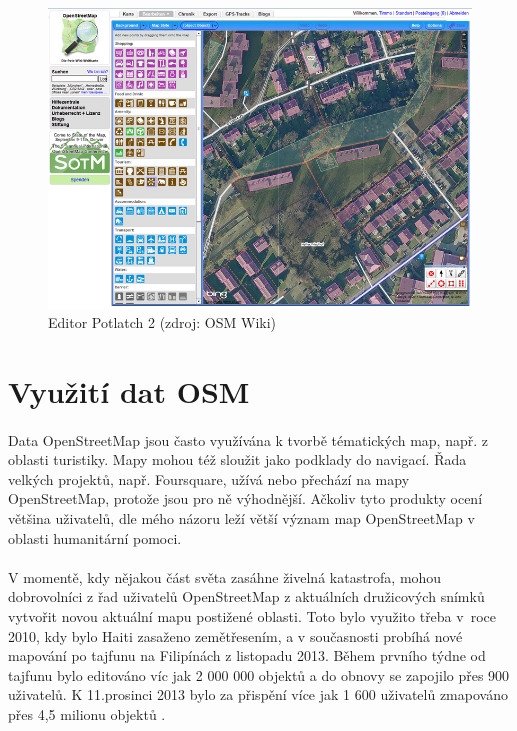 \documentclass[11pt,a4paper,titlepage,oneside]{book}
\begin{document}
		\begin{figure}[!h]
			\begin{center}
				\includegraphics[width=12cm]{obrazky/p2_osm.png}
				\caption{Editor Potlatch 2 (zdroj: OSM Wiki\cite{wiki_p2})}
			\end{center}
		\end{figure}

	\section{Využití dat OSM}
		\paragraph{} Data OpenStreetMap jsou často využívána k tvorbě tématických map, např. z oblasti turistiky. Mapy mohou též sloužit jako podklady do navigací. Řada velkých projektů, např. Foursquare, užívá nebo přechází na mapy OpenStreetMap, protože jsou pro ně výhodnější. Ačkoliv tyto produkty ocení většina uživatelů, dle mého názoru leží větší význam map OpenStreetMap v oblasti humanitární pomoci.
		\paragraph{}V momentě, kdy nějakou část světa zasáhne živelná katastrofa, mohou dobrovolníci z řad uživatelů OpenStreetMap z aktuálních družicových snímků vytvořit novou aktuální mapu postižené oblasti. Toto bylo využito třeba v~roce 2010, kdy bylo Haiti zasaženo zemětřesením, a v současnosti probíhá nové mapování po tajfunu na Filipínách z listopadu 2013. Během prvního týdne od tajfunu bylo editováno víc jak 2 000 000 objektů a do obnovy se zapojilo přes 900 uživatelů. K 11.prosinci 2013 bylo za přispění více jak 1 600 uživatelů zmapováno přes 4,5 milionu objektů \cite{wiki_tajfun}.
\end{document}
